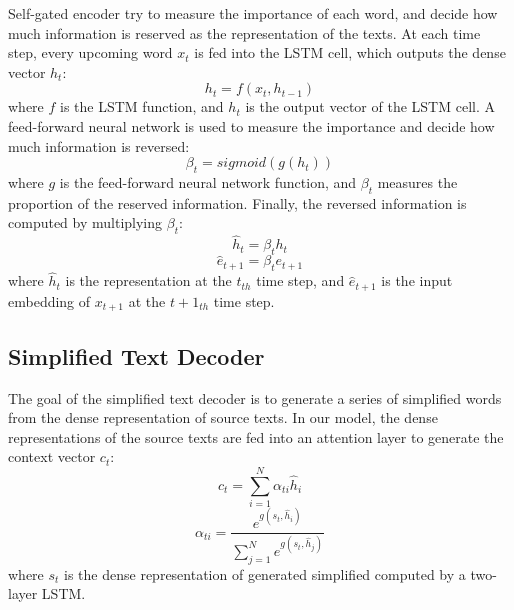 \documentclass{clv3}
\begin{document}
\begin{CJK*}{UTF8}{gbsn}
Self-gated encoder try to measure the importance of each word, and decide how much information is reserved as the representation of the texts. At each time step, every upcoming word $x_t$ is fed into the LSTM cell, which outputs the dense vector $h_t$:
\begin{equation}
h_t = f(x_t,h_{t-1})
\end{equation}
where $f$ is the LSTM function, and $h_t$ is the output vector of the LSTM cell. A feed-forward neural network is used to measure the importance and decide how much information is reversed:
\begin{equation}
\beta_t=sigmoid(g(h_t))
\end{equation}
where $g$ is the feed-forward neural network function, and $\beta_t$ measures the proportion of the reserved information. Finally, the reversed information is computed by multiplying $\beta_t$:
\begin{equation}
\hat{h}_t=\beta_th_t
\end{equation}
\begin{equation}
\hat{e}_{t+1}=\beta_te_{t+1}
\end{equation}
where $\hat{h}_t$ is the representation at the $t_{th}$ time step, and $\hat{e}_{t+1}$ is the input embedding of $x_{t+1}$ at the $t+1_{th}$ time step.



\subsection{Simplified Text Decoder}

The goal of the simplified text decoder is to generate a series of simplified words from the dense representation of source texts. In our model, the dense representations of the source texts are fed into an attention layer to generate the context vector $c_t$:
\begin{equation}\label{attention1}
c_t=\sum_{i=1}^{N}{\alpha_{ti}\hat{h}_{i}}
\end{equation}
\begin{equation}\label{attention2}
\alpha_{ti}=\frac{e^{g(s_{t},\hat{h}_{i})}}{\sum_{j=1}^{N}{e^{g(s_{t},\hat{h}_{j})}}}
\end{equation}
where $s_t$ is the dense representation of generated simplified computed by a two-layer LSTM. 


\end{CJK*}
\end{document}
